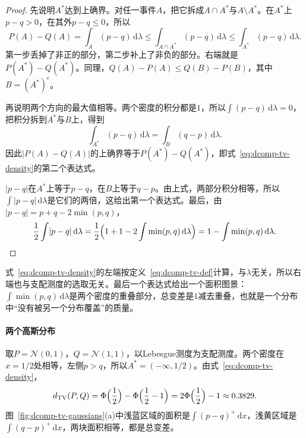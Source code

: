 \begin{proof}
先说明$A^{*}$达到上确界。对任一事件$A$，把它拆成$A\cap A^{*}$与$A\setminus A^{*}$。在$A^{*}$上$p-q>0$，在其外$p-q\leq0$，所以
\[
 P(A)-Q(A)=\int_{A}(p-q)\,\mathrm{d}\lambda\leq\int_{A\cap A^{*}}(p-q)\,\mathrm{d}\lambda\leq\int_{A^{*}}(p-q)\,\mathrm{d}\lambda .
\]
第一步丢掉了非正的部分，第二步补上了非负的部分。右端就是$P(A^{*})-Q(A^{*})$。同理，$Q(A)-P(A)\leq Q(B)-P(B)$，其中$B=(A^{*})^{\mathrm{c}}$。

再说明两个方向的最大值相等。两个密度的积分都是$1$，所以$\int(p-q)\,\mathrm{d}\lambda=0$，把积分拆到$A^{*}$与$B$上，得到
\[
 \int_{A^{*}}(p-q)\,\mathrm{d}\lambda=\int_{B}(q-p)\,\mathrm{d}\lambda .
\]
因此$\lvert P(A)-Q(A)\rvert$的上确界等于$P(A^{*})-Q(A^{*})$，即式~\eqref{eq:dcomp-tv-density}的第二个表达式。

$\lvert p-q\rvert$在$A^{*}$上等于$p-q$，在$B$上等于$q-p$。由上式，两部分积分相等，所以$\int\lvert p-q\rvert\,\mathrm{d}\lambda$是它们的两倍，这给出第一个表达式。最后，由$\lvert p-q\rvert=p+q-2\min(p,q)$，
\[
 \frac12\int\lvert p-q\rvert\,\mathrm{d}\lambda=\frac12\Bigl(1+1-2\int\min(p,q)\,\mathrm{d}\lambda\Bigr)=1-\int\min(p,q)\,\mathrm{d}\lambda .
\]
\end{proof}

式~\eqref{eq:dcomp-tv-density}的左端按定义~\eqref{eq:dcomp-tv-def}计算，与$\lambda$无关，所以右端也与支配测度的选取无关。最后一个表达式给出一个面积图景：$\int\min(p,q)\,\mathrm{d}\lambda$是两个密度的重叠部分，总变差是$1$减去重叠，也就是一个分布中“没有被另一个分布覆盖”的质量。

\paragraph{两个高斯分布}
取$P=\mathcal{N}(0,1)$，$Q=\mathcal{N}(1,1)$，以Lebesgue测度为支配测度。两个密度在$x=1/2$处相等，左侧$p>q$，所以$A^{*}=(-\infty,1/2)$。由式~\eqref{eq:dcomp-tv-density}，
\[
 d_{\mathrm{TV}}(P,Q)=\Phi\Bigl(\frac12\Bigr)-\Phi\Bigl(\frac12-1\Bigr)=2\Phi\Bigl(\frac12\Bigr)-1\approx0.3829 .
\]
图~\ref{fig:dcomp-tv-gaussians}(a)中浅蓝区域的面积是$\int(p-q)^{+}\,\mathrm{d}x$，浅黄区域是$\int(q-p)^{+}\,\mathrm{d}x$，两块面积相等，都是总变差。

